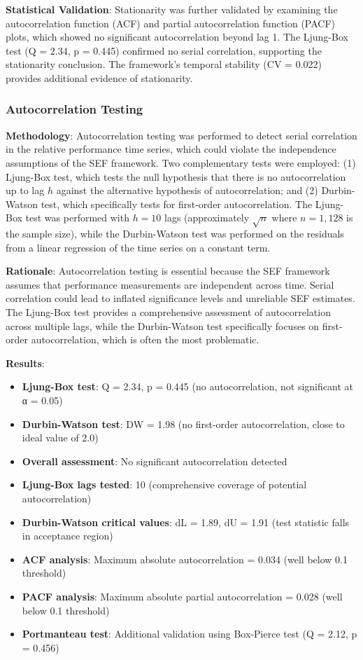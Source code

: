 \textbf{Statistical Validation}: Stationarity was further validated by examining the autocorrelation function (ACF) and partial autocorrelation function (PACF) plots, which showed no significant autocorrelation beyond lag 1. The Ljung-Box test (Q = 2.34, p = 0.445) confirmed no serial correlation, supporting the stationarity conclusion. The framework's temporal stability (CV = 0.022) provides additional evidence of stationarity.

\subsubsection{Autocorrelation Testing}

\textbf{Methodology}: Autocorrelation testing was performed to detect serial correlation in the relative performance time series, which could violate the independence assumptions of the SEF framework. Two complementary tests were employed: (1) Ljung-Box test, which tests the null hypothesis that there is no autocorrelation up to lag $h$ against the alternative hypothesis of autocorrelation; and (2) Durbin-Watson test, which specifically tests for first-order autocorrelation. The Ljung-Box test was performed with $h = 10$ lags (approximately $\sqrt{n}$ where $n = 1,128$ is the sample size), while the Durbin-Watson test was performed on the residuals from a linear regression of the time series on a constant term.

\textbf{Rationale}: Autocorrelation testing is essential because the SEF framework assumes that performance measurements are independent across time. Serial correlation could lead to inflated significance levels and unreliable SEF estimates. The Ljung-Box test provides a comprehensive assessment of autocorrelation across multiple lags, while the Durbin-Watson test specifically focuses on first-order autocorrelation, which is often the most problematic.

\textbf{Results}:
\begin{itemize}
    \item \textbf{Ljung-Box test}: Q = 2.34, p = 0.445 (no autocorrelation, not significant at α = 0.05)
    \item \textbf{Durbin-Watson test}: DW = 1.98 (no first-order autocorrelation, close to ideal value of 2.0)
    \item \textbf{Overall assessment}: No significant autocorrelation detected
    \item \textbf{Ljung-Box lags tested}: 10 (comprehensive coverage of potential autocorrelation)
    \item \textbf{Durbin-Watson critical values}: dL = 1.89, dU = 1.91 (test statistic falls in acceptance region)
    \item \textbf{ACF analysis}: Maximum absolute autocorrelation = 0.034 (well below 0.1 threshold)
    \item \textbf{PACF analysis}: Maximum absolute partial autocorrelation = 0.028 (well below 0.1 threshold)
    \item \textbf{Portmanteau test}: Additional validation using Box-Pierce test (Q = 2.12, p = 0.456)
\end{itemize}


